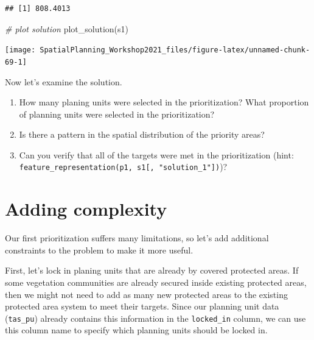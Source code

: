\documentclass[
  12pt,
]{book}
\newenvironment{Shaded}{\begin{snugshade}}{\end{snugshade}}
\newcommand{\CommentTok}[1]{\textcolor[rgb]{0.56,0.35,0.01}{\textit{#1}}}
\newcommand{\FunctionTok}[1]{\textcolor[rgb]{0.00,0.00,0.00}{#1}}
\newcommand{\NormalTok}[1]{#1}
\newcommand{\SpecialCharTok}[1]{\textcolor[rgb]{0.00,0.00,0.00}{#1}}
\providecommand{\tightlist}{%
  \setlength{\itemsep}{0pt}\setlength{\parskip}{0pt}}
\begin{document}
\begin{Shaded}
\end{Shaded}

\begin{verbatim}
## [1] 808.4013
\end{verbatim}

\begin{Shaded}
\begin{Highlighting}[]
\CommentTok{\# plot solution}
\FunctionTok{plot\_solution}\NormalTok{(s1)}
\end{Highlighting}
\end{Shaded}

\begin{center}\texttt{[image: SpatialPlanning\_Workshop2021\_files/figure-latex/unnamed-chunk-69-1]} \end{center}

Now let's examine the solution.

\begin{rmdquestion}
\begin{enumerate}
\def\labelenumi{\arabic{enumi}.}
\tightlist
\item
  How many planing units were selected in the prioritization? What proportion of planning units were selected in the prioritization?
\item
  Is there a pattern in the spatial distribution of the priority areas?
\item
  Can you verify that all of the targets were met in the prioritization (hint: \texttt{feature\_representation(p1,\ s1{[},\ "solution\_1"{]})})?
\end{enumerate}
\end{rmdquestion}

\hypertarget{adding-complexity}{%
\section{Adding complexity}\label{adding-complexity}}

Our first prioritization suffers many limitations, so let's add additional constraints to the problem to make it more useful.

First, let's lock in planing units that are already by covered protected areas. If some vegetation communities are already secured inside existing protected areas, then we might not need to add as many new protected areas to the existing protected area system to meet their targets. Since our planning unit data (\texttt{tas\_pu}) already contains this information in the \texttt{locked\_in} column, we can use this column name to specify which planning units should be locked in.
\end{document}
